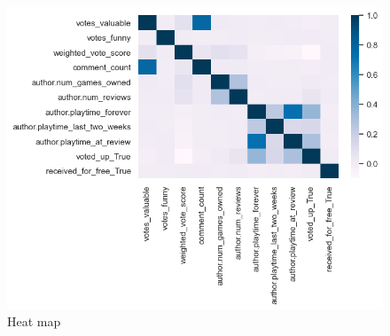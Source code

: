 \documentclass[12pt]{article}
\begin{document}
\begin{figure}[H]
\flushleft
\includegraphics[scale=0.70]{images/heatmap.png}
\caption{Heat map}
\label{fig:heatmap}
\end{figure}
\end{document}
